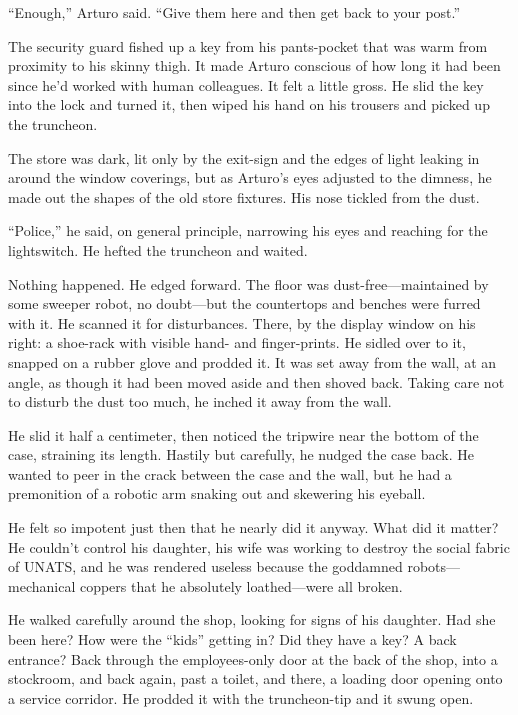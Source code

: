 “Enough,” Arturo said. “Give them here and then get back to your
post.”

The security guard fished up a key from his pants-pocket that was
warm from proximity to his skinny thigh. It made Arturo conscious
of how long it had been since he’d worked with human colleagues. It
felt a little gross. He slid the key into the lock and turned it,
then wiped his hand on his trousers and picked up the truncheon.

The store was dark, lit only by the exit-sign and the edges of
light leaking in around the window coverings, but as Arturo’s eyes
adjusted to the dimness, he made out the shapes of the old store
fixtures. His nose tickled from the dust.

“Police,” he said, on general principle, narrowing his eyes and
reaching for the lightswitch. He hefted the truncheon and waited.

Nothing happened. He edged forward. The floor was
dust-free—maintained by some sweeper robot, no doubt—but the
countertops and benches were furred with it. He scanned it for
disturbances. There, by the display window on his right: a
shoe-rack with visible hand- and finger-prints. He sidled over to
it, snapped on a rubber glove and prodded it. It was set away from
the wall, at an angle, as though it had been moved aside and then
shoved back. Taking care not to disturb the dust too much, he
inched it away from the wall.

He slid it half a centimeter, then noticed the tripwire near the
bottom of the case, straining its length. Hastily but carefully, he
nudged the case back. He wanted to peer in the crack between the
case and the wall, but he had a premonition of a robotic arm
snaking out and skewering his eyeball.

He felt so impotent just then that he nearly did it anyway. What
did it matter? He couldn’t control his daughter, his wife was
working to destroy the social fabric of UNATS, and he was rendered
useless because the goddamned robots—mechanical coppers that he
absolutely loathed—were all broken.

He walked carefully around the shop, looking for signs of his
daughter. Had she been here? How were the “kids” getting in? Did
they have a key? A back entrance? Back through the employees-only
door at the back of the shop, into a stockroom, and back again,
past a toilet, and there, a loading door opening onto a service
corridor. He prodded it with the truncheon-tip and it swung open.

